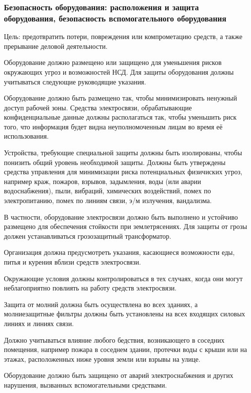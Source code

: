 \documentclass[12pt, russian, oneside, article]{ncc}
\begin{document}
\subsubsection{Безопасность оборудования: расположения и защита оборудования, безопасность вспомогательного оборудования}
\label{sec-5_5_4}


Цель: предотвратить потери, повреждения или компрометацию средств, а также прерывание деловой деятельности.

Оборудование должно размещено или защищено для уменьшения рисков окружающих угроз и возможностей НСД. Для защиты оборудования должны учитываться следующие руководящие указания.

Оборудование должно быть размещено так, чтобы минимизировать ненужный доступ рабочей зоны. Средства электросвязи, обрабатывающие конфиденциальные данные должны располагаться так, чтобы уменьшить риск того, что информация будет видна неуполномоченным лицам во время её использования.

Устройства, требующие специальной защиты должны быть изолированы, чтобы понизить общий уровень необходимой защиты. Должны быть утверждены средства управления для минимизации риска потенциальных физичиских угроз, например краж, пожаров, взрывов, задымления, воды (или аварии водоснабжения), пыли, вибраций, химических воздействий, помех по электропитанию, помех по линиям связи, э/м излучения, вандализма.

В частности, оборудование электросвязи должно быть выполнено и устойчиво размещено для обеспечения стойкости при землетрясениях. Для защиты от грозы должен устанавливаться грозозащитный трансформатор.

Организация должна предусмотреть указания, касающиеся возможности еды, питья и курения вблизи средств электросвязи.

Окружающие условия должны контролироваться в тех случаях, когда они могут неблагоприятно повлиять на работу средств электросвязи.

Защита от молний должна быть осуществлена во всех зданиях, а молниезащитные фильтры должны быть установлены на всех входящих силовых линиях и линиях связи.

Должно учитываться влияние любого бедствия, возникающего в соседних помещения, например пожара в соседнем здании, протечки воды с крыши или на этажах, расположенных ниже уровня земли или взрывы на улице.

Оборудование должно быть защищено от аварий электроснабжения и других нарушения, вызванных вспомогательными средствами.
\end{document}
